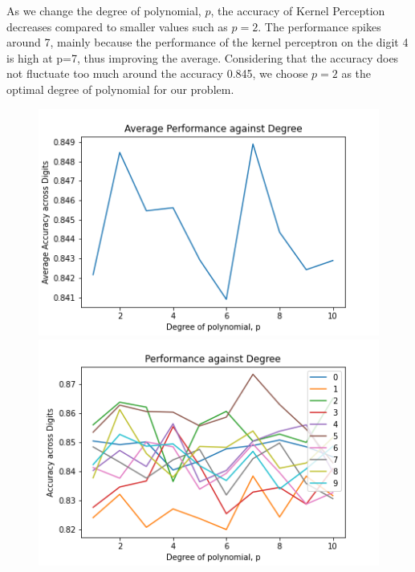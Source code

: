 \documentclass[twoside,11pt]{homework}
\begin{document}
	As we change the degree of polynomial, $p$, the accuracy of Kernel Perception decreases compared to smaller values
	such as $p=2$. The performance spikes around 7,  mainly because the performance of the kernel perceptron on the digit 4 is 
	high at p=7, thus improving the average. Considering that the accuracy does not fluctuate too much around the accuracy 0.845,
	we choose $p=2$ as the optimal degree of polynomial for our problem.
	\begin{figure}[H]
		\includegraphics[scale=0.5]{q6/img/degree_ker.png}
		\includegraphics[scale=0.5]{q6/img/degree_ker_all.png}
	\end{figure}
\end{document}
